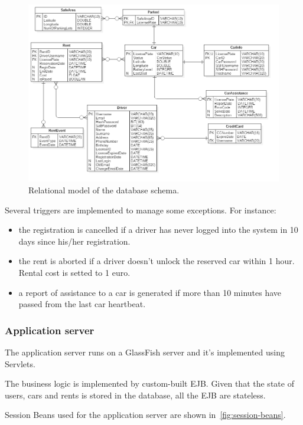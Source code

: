 \begin{figure}[H]
	\centering
	\includegraphics[width=\textwidth, keepaspectratio]{diagrams/Relational.png}
	\caption{Relational model of the database schema.}
	\label {fig:relational}
\end{figure}

Several triggers are implemented to manage some exceptions. For instance:
\begin{itemize}
	\item the registration is cancelled if a driver has never logged into the system in 10 days since his/her registration.
	\item the rent is aborted if a driver doesn't unlock the reserved car within 1 hour. Rental cost is setted to 1 euro.
	\item a report of assistance to a car is generated if more than 10 minutes have passed from the last car heartbeat.
\end{itemize}

\subsubsection{Application server}

The application server runs on a GlassFish server and it's implemented using Servlets. 

The business logic is implemented by custom-built EJB. Given that the state of users, cars and rents is stored in the database, all the EJB are stateless.

Session Beans used for the application server are shown in~\autoref{fig:session-beans}.

